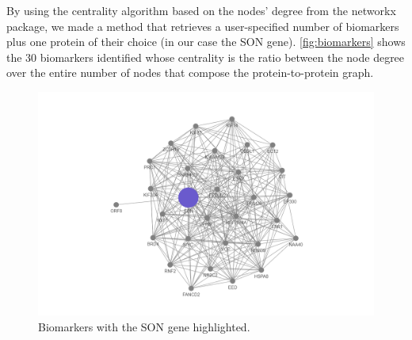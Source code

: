 By using the centrality algorithm based on the nodes' degree from the networkx package, we made a method that retrieves a user-specified number of biomarkers plus one protein of their choice (in our case the SON gene). \autoref{fig:biomarkers} shows the $30$ biomarkers identified whose centrality is the ratio between the node degree over the entire number of nodes that compose the protein-to-protein graph.
\begin{figure}[H]
    \centering
    \includegraphics[width=1\linewidth]{images/plots/plot_biomarkers.png}
    \caption{Biomarkers with the SON gene highlighted.}
    \label{fig:biomarkers}
\end{figure}
